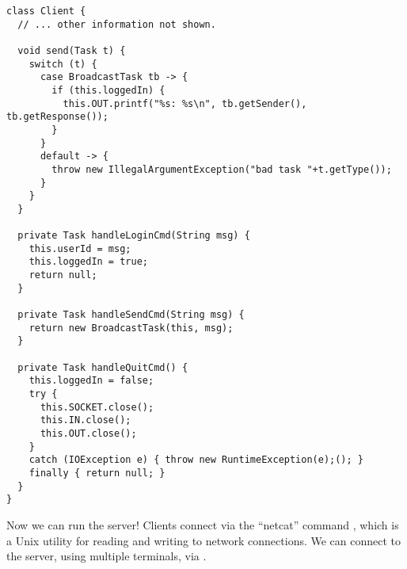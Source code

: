 \begin{lstlisting}[language=MyJava]
class Client {
  // ... other information not shown.

  void send(Task t) {
    switch (t) {
      case BroadcastTask tb -> {
        if (this.loggedIn) { 
          this.OUT.printf("%s: %s\n", tb.getSender(), tb.getResponse()); 
        }
      }
      default -> {
        throw new IllegalArgumentException("bad task "+t.getType());
      }
    }
  }

  private Task handleLoginCmd(String msg) {
    this.userId = msg;
    this.loggedIn = true;
    return null;
  }

  private Task handleSendCmd(String msg) {
    return new BroadcastTask(this, msg);
  }

  private Task handleQuitCmd() {
    this.loggedIn = false;
    try {
      this.SOCKET.close();
      this.IN.close();
      this.OUT.close();
    } 
    catch (IOException e) { throw new RuntimeException(e);(); }
    finally { return null; }
  }
}
\end{lstlisting}

Now we can run the server! 
Clients connect via the ``netcat'' command , which is a Unix utility for reading and writing to network connections. 
We can connect to the server, using multiple terminals, via .
